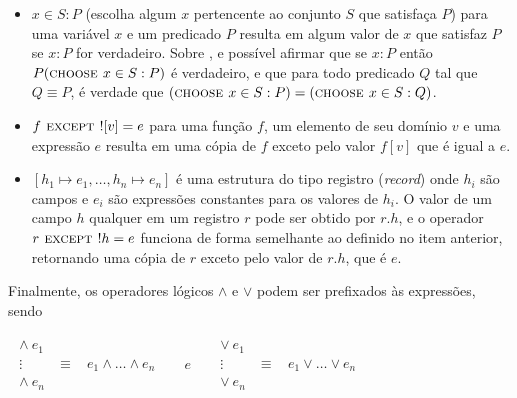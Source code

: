 \begin{itemize}

  \item \CHOOSE $x \in S : P$ (escolha algum $x$ pertencente ao conjunto $S$ que satisfaça $P$) para uma variável $x$ e um predicado $P$ resulta em algum valor de $x$ que satisfaz $P$ se \EE $x : P$ for verdadeiro. Sobre \CHOOSE, e possível afirmar que se \EE $x : P$ então $P(\textsc{choose } x \in S : P)$ é verdadeiro, e que para todo predicado $Q$ tal que $Q \equiv P$, é verdade que $(\textsc{choose } x \in S : P) = (\textsc{choose } x \in S : Q)$.

  \item $f \textsc{ except } ![v] = e$ para uma função $f$, um elemento de seu domínio $v$ e uma expressão $e$ resulta em uma cópia de $f$ exceto pelo valor $f[v]$ que é igual a $e$.

  \item $[h_1 \mapsto e_1, \dots, h_n \mapsto e_n]$ é uma estrutura do tipo registro (\textit{record}) onde $h_i$ são campos e $e_i$ são expressões constantes para os valores de $h_i$. O valor de um campo $h$ qualquer em um registro $r$ pode ser obtido por $r.h$, e o operador $r \textsc{ except } !h = e$ funciona de forma semelhante ao definido no item anterior, retornando uma cópia de $r$ exceto pelo valor de $r.h$, que é $e$.

\end{itemize}

Finalmente, os operadores lógicos $\land$ e $\lor$ podem ser prefixados às expressões, sendo

\begin{center}
  $\begin{array}{lll}
\begin{array}{ll}
  \land\ e_1\\
  \vdots ~~~~ & \equiv ~~~~ e_1 \land \dots \land e_n\\
  \land\ e_n
\end{array} &
~~~~ e ~~~~ &
\begin{array}{ll}
  \lor\ e_1\\
  \vdots ~~~~ & \equiv ~~~~ e_1 \lor \dots \lor e_n\\
  \lor\ e_n
\end{array}
\end{array}$
\end{center}

